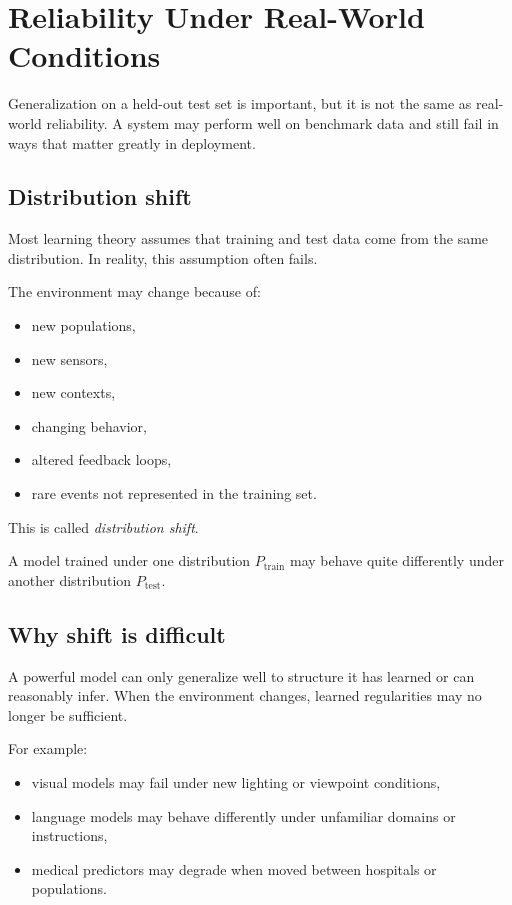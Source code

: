 \section{Reliability Under Real-World Conditions}

Generalization on a held-out test set is important, but it is not the same as real-world reliability.
A system may perform well on benchmark data and still fail in ways that matter greatly in deployment.

\subsection*{Distribution shift}

Most learning theory assumes that training and test data come from the same distribution.
In reality, this assumption often fails.

\medskip

The environment may change because of:
\begin{itemize}
    \item new populations,
    \item new sensors,
    \item new contexts,
    \item changing behavior,
    \item altered feedback loops,
    \item rare events not represented in the training set.
\end{itemize}

This is called \emph{distribution shift}.

\medskip

A model trained under one distribution \(P_{\mathrm{train}}\) may behave quite differently under another distribution \(P_{\mathrm{test}}\).

\subsection*{Why shift is difficult}

A powerful model can only generalize well to structure it has learned or can reasonably infer.
When the environment changes, learned regularities may no longer be sufficient.

\medskip

For example:
\begin{itemize}
    \item visual models may fail under new lighting or viewpoint conditions,
    \item language models may behave differently under unfamiliar domains or instructions,
    \item medical predictors may degrade when moved between hospitals or populations.
\end{itemize}

